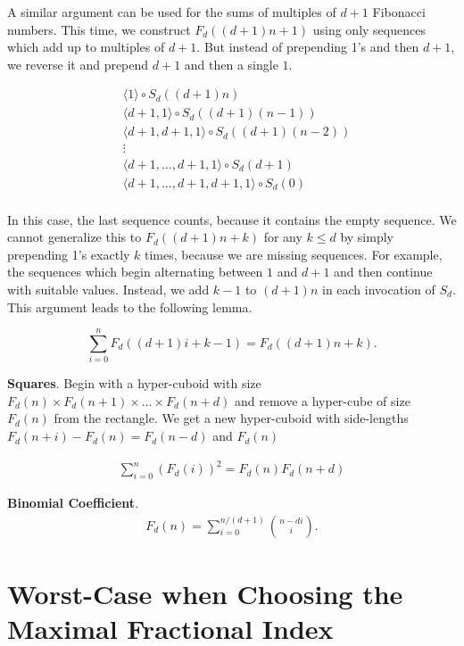 \documentclass[english,version-2020-11]{uzl-thesis}
\begin{document}
A similar argument can be used for the sums of multiples of $d + 1$ Fibonacci numbers.
This time, we construct $F_d((d + 1)n + 1)$ using only sequences which add up to multiples of $d + 1$.
But instead of prepending 1's and then $d + 1$, we reverse it and prepend $d + 1$ and then a single $1$.

\begin{align*}
  & \langle 1 \rangle \circ S_d((d + 1)n) \\
  & \langle d + 1, 1 \rangle \circ S_d((d + 1)(n - 1)) \\
  & \langle d + 1, d + 1, 1 \rangle \circ S_d((d + 1)(n - 2)) \\
  & \vdots \\
  & \langle d + 1, \dots, d + 1, 1 \rangle \circ S_d(d + 1) \\
  & \langle d + 1, \dots, d + 1, d + 1, 1 \rangle \circ S_d(0) \\
\end{align*}

In this case, the last sequence counts, because it contains the empty sequence.
We cannot generalize this to $F_d((d + 1)n + k)$ for any $k \le d$
by simply prepending 1's exactly $k$ times, because we are missing sequences.
For example, the sequences which begin alternating between $1$ and $d + 1$
and then continue with suitable values.
Instead, we add $k - 1$ to $(d + 1)n$ in each invocation of $S_d$.
This argument leads to the following lemma.

\begin{lemma}
  \[\sum_{i=0}^n F_d((d + 1)i + k - 1) = F_d((d + 1)n + k).\]
\end{lemma}

\textbf{Squares}.
Begin with a hyper-cuboid with size $F_d(n) \times F_d(n + 1) \times \dots \times F_d(n + d)$
and remove a hyper-cube of size $F_d(n)$ from the rectangle.
We get a new hyper-cuboid with side-lengths $F_d(n + i) - F_d(n) = F_d(n - d)$ and $F_d(n)$

\begin{lemma}
  \begin{align*}
    \sum_{i = 0}^n (F_d(i))^2 = F_d(n) F_d(n + d)
  \end{align*}
\end{lemma}

\textbf{Binomial Coefficient}.
\begin{align*}
  F_d(n) = \sum_{i=0}^{n / (d + 1)} \binom{n - di}{i}.
\end{align*}

\section{Worst-Case when Choosing the Maximal Fractional Index}
\end{document}
